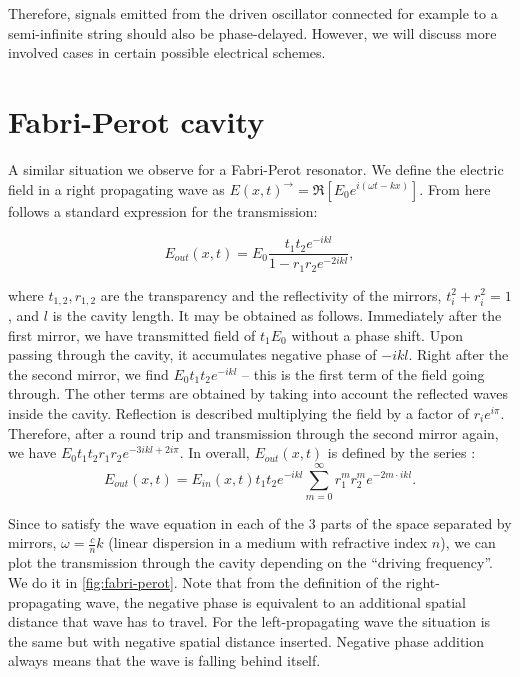 \documentclass{article}
\begin{document}
	Therefore, signals emitted from the driven oscillator connected for example to a semi-infinite string should also be phase-delayed. However, we will discuss more involved cases in certain possible electrical schemes.
	
	\section{Fabri-Perot cavity}
	
	A similar situation we observe for a Fabri-Perot resonator. We define the electric field in a right propagating wave as 
	$E(x,t)^\rightarrow = \Re [E_0 e^{i(\omega t - k x)}].$ From here follows a standard expression for the transmission:
	
	\begin{equation}
		E_{out}(x,t) = E_0 \frac{t_1 t_2 e^{-ikl}}{1 - r_1 r_2 e^{-2 ikl}},
	\end{equation}
	
	where $t_{1,2}, r_{1,2} $ are the transparency and the reflectivity of the mirrors, $t_i^2+r_i^2 = 1$, and $ l $ is the cavity length. It may be obtained as follows. Immediately after the first mirror, we have transmitted field of $t_1 E_0$ without a phase shift. Upon passing through the cavity, it accumulates negative phase of $-ikl$. Right after the the second mirror, we find $E_0 t_1 t_2 e^{-ikl}$ -- this is the first term of the field going through. The other terms are obtained by taking into account the reflected waves inside the cavity. Reflection is described multiplying the field by a factor of $r_i e^{i \pi}$. Therefore, after a round trip and transmission through the second mirror again, we have $E_0 t_1 t_2 r_1 r_2 e^{-3ikl + 2i\pi}$. In overall, $E_{out}(x, t)$ is defined by the series :
	\begin{equation}
		E_{out}(x,t) = E_{in}(x,t) t_1 t_2 e^{-ikl} \sum_{m=0}^{\infty} r_1^m r_2^m  e^{-2m \cdot ikl}.
	\end{equation}
	
	Since to satisfy the wave equation in each of the 3 parts of the space separated by mirrors, $\omega = \frac{c}{n} k$ (linear dispersion in a medium with refractive index $n$), we can plot the transmission through the cavity depending on the ``driving frequency''. We do it in \autoref{fig:fabri-perot}. Note that from the definition of the right-propagating wave, the negative phase is equivalent to an additional spatial distance that wave has to travel. For the left-propagating wave the situation is the same but with negative spatial distance inserted. Negative phase addition always means that the wave is falling behind itself.
	
\end{document}
